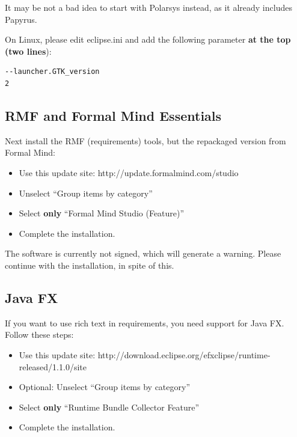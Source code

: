 \begin{info}
It may be not a bad idea to start with Polarsys instead, as it already includes Papyrus.
\end{info}

\begin{warning}On Linux, please edit eclipse.ini and add the following parameter \textbf{at the top (two lines}):

\begin{lstlisting}
--launcher.GTK_version
2
\end{lstlisting}
\end{warning}

\subsection{RMF and Formal Mind Essentials}

Next install the RMF (requirements) tools, but the repackaged version from Formal Mind:

\begin{itemize}
\item Use this update site: http://update.formalmind.com/studio
\item Unselect ``Group items by category''
\item Select \textbf{only} ``Formal Mind Studio (Feature)''
\item Complete the installation.
\end{itemize}

\begin{info}
The software is currently not signed, which will generate a warning.  Please continue with the installation, in spite of this.
\end{info}

\subsection{Java FX}

If you want to use rich text in requirements, you need support for Java FX.  Follow these steps:

\begin{itemize}
\item Use this update site: http://download.eclipse.org/efxclipse/runtime-released/1.1.0/site
\item Optional: Unselect ``Group items by category''
\item Select \textbf{only} ``Runtime Bundle Collector Feature''
\item Complete the installation.
\end{itemize}


